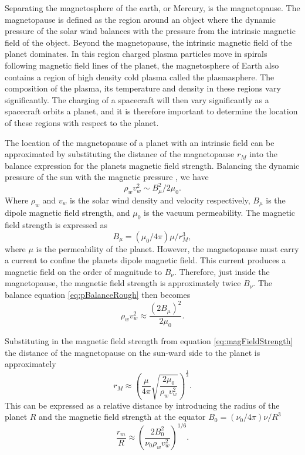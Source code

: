 Separating the magnetosphere of the earth, or Mercury, is the magnetopause. The magnetopause is defined as the region around an object where the dynamic pressure of the solar wind balances with the pressure from the intrinsic magnetic field of the object. Beyond the magnetopause, the intrinsic magnetic field of the planet dominates. In this region charged plasma particles move in spirals following magnetic field lines of the planet, the magnetosphere of Earth also contains a region of high density cold plasma called the plasmasphere. The composition of the plasma, its temperature and density in these regions vary significantly. The charging of a spacecraft will then vary significantly as a spacecraft orbits a planet, and it is therefore important to determine the location of these regions with respect to the planet. 

The location of the magnetopause of a planet with an intrinsic field can be approximated by substituting the distance of the magnetopause $r_M$ into the balance expression for the planets magnetic field strength. Balancing the dynamic pressure of the sun with the magnetic pressure \parencite{Meyer-Vernet2007}, we have
\begin{equation}\label{eq:pBalanceRough}
\rho_w v^2_w \sim B^2_{\mu} / 2 \mu_0.  
\end{equation}
Where $\rho_w$ and $v_w$ is the solar wind density and velocity respectively, $B_{\mu}$ is the dipole magnetic field strength, and $\mu_0$ is the vacuum permeability. The magnetic field strength is expressed as
\begin{equation}\label{eq:magFieldStrength}
    B_{\mu} = (\mu_0 / 4 \pi) \mu / r^3_M,
\end{equation}
where $\mu$ is the permeability of the planet. However, the magnetopause must carry a current to confine the planets dipole magnetic field. This current produces a magnetic field on the order of magnitude to $B_{\nu}$. Therefore, just inside the magnetopause, the magnetic field strength is approximately twice $B_{\nu}$. The balance equation \eqref{eq:pBalanceRough} then becomes 
\begin{equation}\label{eq:pressureBalance}
    \rho_w v^2_w \approx \frac{(2 B_{\mu})^2}{2 \mu_0}. 
\end{equation}

Substituting in the magnetic field strength from equation \eqref{eq:magFieldStrength} the distance of the magnetopause on the sun-ward side to the planet is approximately 
\begin{equation}\label{eq:magnetopause}
    r_M \approx \left(\frac{\mu}{4 \pi} \sqrt{\frac{2 \mu_0}{\rho_w v^2_w}} \right)^{\frac{1}{3}}.
\end{equation}
This can be expressed as a relative distance by introducing the radius of the planet $R$ and the magnetic field strength at the equator $B_0 = (\nu_0 / 4 \pi) \nu / R^3$
\begin{equation}
    \frac{r_m}{R} \approx \left(\frac{2 B^2_0}{\nu_0 \rho_w v^2_w} \right)^{1/6}.
\end{equation}

